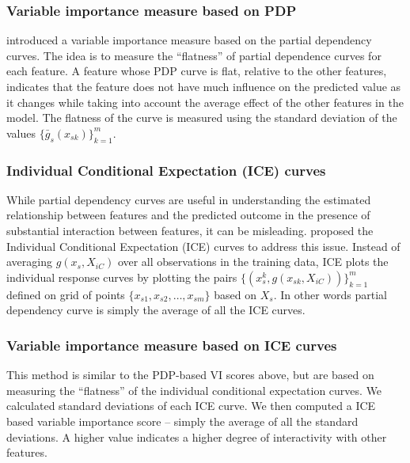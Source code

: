 \documentclass[11pt,a4paper,]{article}
\begin{document}
\subsubsection{Variable importance measure based on
PDP}\label{variable-importance-measure-based-on-pdp}

\textcite{Greenwell2018} introduced a variable importance measure based
on the partial dependency curves. The idea is to measure the
``flatness'' of partial dependence curves for each feature. A feature
whose PDP curve is flat, relative to the other features, indicates that
the feature does not have much influence on the predicted value as it
changes while taking into account the average effect of the other
features in the model. The flatness of the curve is measured using the
standard deviation of the values \(\{\bar{g}_{s}(x_{sk})\}_{k=1}^{m}\).

\subsubsection{Individual Conditional Expectation (ICE)
curves}\label{individual-conditional-expectation-ice-curves}

While partial dependency curves are useful in understanding the
estimated relationship between features and the predicted outcome in the
presence of substantial interaction between features, it can be
misleading. \textcite{goldstein2015peeking} proposed the Individual
Conditional Expectation (ICE) curves to address this issue. Instead of
averaging \(g(x_s, X_{iC})\) over all observations in the training data,
ICE plots the individual response curves by plotting the pairs
\(\{(x_s^k, g(x_{sk}, X_{iC}))\}_{k=1}^{m}\) defined on grid of points
\(\{x_{s1}, x_{s2},\dots, x_{sm}\}\) based on \(X_s\). In other words
partial dependency curve is simply the average of all the ICE curves.

\subsubsection{Variable importance measure based on ICE
curves}\label{variable-importance-measure-based-on-ice-curves}

This method is similar to the PDP-based VI scores above, but are based
on measuring the ``flatness'' of the individual conditional expectation
curves. We calculated standard deviations of each ICE curve. We then
computed a ICE based variable importance score -- simply the average of
all the standard deviations. A higher value indicates a higher degree of
interactivity with other features.
\end{document}

